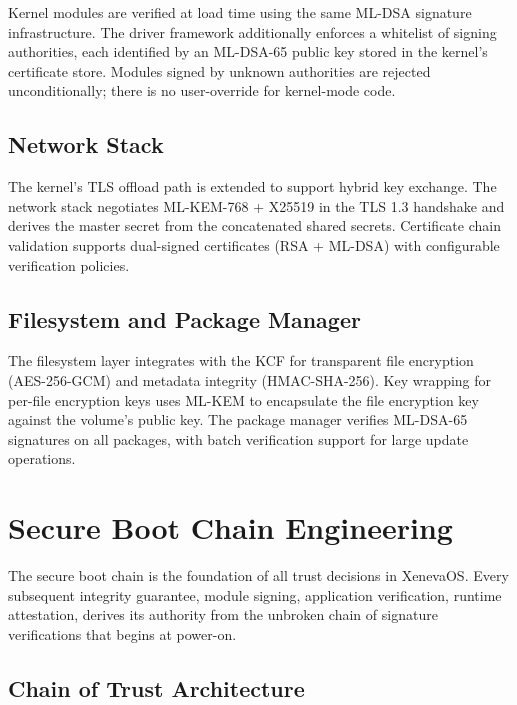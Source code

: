 \documentclass[11pt, a4paper]{article}
\begin{document}
Kernel modules are verified at load time using the same ML-DSA signature infrastructure. The driver framework additionally enforces a whitelist of signing authorities, each identified by an ML-DSA-65 public key stored in the kernel's certificate store. Modules signed by unknown authorities are rejected unconditionally; there is no user-override for kernel-mode code.

\subsection{Network Stack}\label{sec:net-integration}

The kernel's TLS offload path is extended to support hybrid key exchange. The network stack negotiates ML-KEM-768 + X25519 in the TLS 1.3 handshake and derives the master secret from the concatenated shared secrets. Certificate chain validation supports dual-signed certificates (RSA + ML-DSA) with configurable verification policies.

\subsection{Filesystem and Package Manager}\label{sec:fs-integration}

The filesystem layer integrates with the KCF for transparent file encryption (AES-256-GCM) and metadata integrity (HMAC-SHA-256). Key wrapping for per-file encryption keys uses ML-KEM to encapsulate the file encryption key against the volume's public key. The package manager verifies ML-DSA-65 signatures on all packages, with batch verification support for large update operations.

\section{Secure Boot Chain Engineering}\label{sec:secure-boot-chain}

The secure boot chain is the foundation of all trust decisions in XenevaOS. Every subsequent integrity guarantee, module signing, application verification, runtime attestation, derives its authority from the unbroken chain of signature verifications that begins at power-on.

\subsection{Chain of Trust Architecture}\label{sec:cot}
\end{document}
